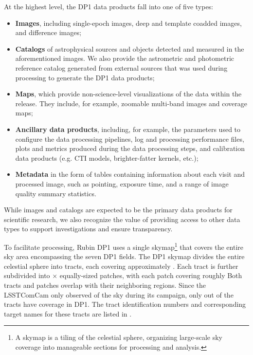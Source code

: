 At the highest level, the \gls{DP1} data products fall into one of five types:
\begin{itemize}
\item \textbf{Images}, including single-\gls{epoch} images, deep and template coadded images, and difference images;
\item \textbf{Catalogs} of astrophysical sources and objects detected and measured in the aforementioned images. We also provide the astrometric and photometric reference catalog generated from external sources that was used during processing to generate the \gls{DP1} data products;
\item \textbf{Maps}, which provide non-science-level visualizations of the data within the release. They include, for example, zoomable multi-band images and coverage maps;
\item \textbf{Ancillary data products}, including, for example, the parameters used to configure the data processing pipelines, log and processing performance files, plots and metrics produced during the data processing steps, and \gls{calibration} data products (e.g. \gls{CTI} models, brighter-fatter kernels, etc.);
\item \textbf{Metadata} in the form of tables containing information about each visit and processed image, such as pointing, exposure time, and a range of image quality summary statistics.
\end{itemize}
While images and catalogs are expected to be the primary data products for scientific research, we also recognize the value of providing access to other data types to support investigations and ensure transparency.

To facilitate processing, Rubin \gls{DP1} uses a single skymap\footnote{A skymap is a tiling of the celestial sphere, organizing large-scale sky coverage into manageable sections for processing and analysis.} that covers the entire sky area encompassing the seven DP1 fields.
The \gls{DP1} skymap divides the entire celestial sphere into \ntotaltracts tracts, each covering approximately \tractarea.
Each \gls{tract} is further subdivided into \npatchx × \npatchy equally-sized patches, with each patch covering roughly \innerpatcharea
Both tracts and patches overlap with their neighboring regions.
Since the \gls{LSSTComCam} only observed \totalarea of the sky during its campaign, only \ncoveredtracts out of the \ntotaltracts tracts have coverage in \gls{DP1}.
The \gls{tract} identification numbers and corresponding target names for these tracts are listed in .


